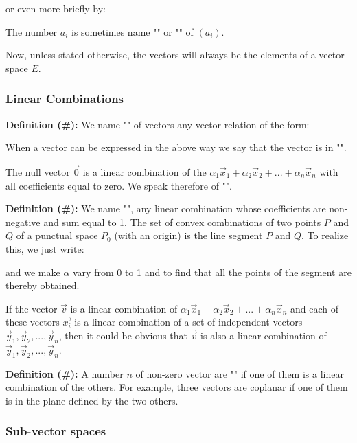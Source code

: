 	or even more briefly by:
	
	The number $a_i$ is sometimes name "" or "" of $(a_i)$.

Now, unless stated otherwise, the vectors will always be the elements of a vector space $E$.

	\subsubsection{Linear Combinations}

\textbf{Definition (\#\mydef):} We name "" of vectors any vector relation of the form:
	
When a vector can be expressed in the above way we say that the vector is in "".

	The null vector $\vec{0}$ is a linear combination of the $\alpha_1\vec{x}_1+\alpha_2\vec{x}_2+...+\alpha_n\vec{x}_n$ with all coefficients equal to zero. We speak therefore of "".

	\textbf{Definition (\#\mydef):} We name "", any linear combination whose coefficients are non-negative and sum equal to 1. The set of convex combinations of two points $P$ and $Q$ of a punctual space $P_0$ (with an origin) is the line segment $P$ and $Q$. To realize this, we just write:
	
	and we make $\alpha$ vary from 0 to 1 and to find that all the points of the segment are thereby obtained.
	
	If the vector $\vec{v}$ is a linear combination of $\alpha_1\vec{x}_1+\alpha_2\vec{x}_2+...+\alpha_n\vec{x}_n$ and each of these vectors $\vec{x_i}$ is a linear combination of a set of independent vectors $\vec{y}_1,\vec{y}_2,...,\vec{y}_n$, then it could be obvious that $\vec{v}$ is also a linear combination of  $\vec{y}_1,\vec{y}_2,...,\vec{y}_n$.
	
	\textbf{Definition (\#\mydef):} A number $n$ of non-zero vector are "" if one of them is a linear combination of the others. For example, three vectors are coplanar if one of them is in the plane defined by the two others.
	
	\subsubsection{Sub-vector spaces}
	
